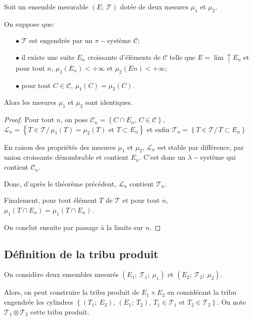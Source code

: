 \begin{theo}
Soit un ensemble mesurable $(E;~\mathcal{T})$ dotée de deux mesures $\mu_1$ et $\mu_2$.

On suppose que:
\begin{itemize}
\item[$\bullet$] $\mathcal{T}$ est engendrée par un $\pi-$système $\mathcal{C}$;
\item[$\bullet$] il existe une suite $E_n$ croissante d'éléments de $\mathcal{C}$ telle que $E = \lim \uparrow E_n$ et pour tout $n$, $\mu_1(E_n)<+\infty$ et $\mu_2(En)<+\infty$;
\item[$\bullet$] pour tout $C \in \mathcal{C}$, $\mu_1(C) = \mu_2(C)$.
\end{itemize}

Alors les mesures $\mu_1$ et $\mu_2$ sont identiques.
\end{theo}


\begin{proof}
Pour tout $n$, on pose $\mathcal{C}_n = \left \{C \cap E_n, \, C \in \mathcal{C} \right \}$, $\mathcal{L}_n = \left \{ T \in \mathcal{T} / \, \mu_1(T)=\mu_2(T) \text{ et }T \subset E_n \right \}$ et enfin $\mathcal{T}_n = \left \{ T \in \mathcal{T}/ \, T \subset E_n\right \}$

En raison des propriétés des mesures $\mu_1$ et $\mu_2$, $\mathcal{L}_n$ est stable par différence, par union croissante dénombrable et contient $E_n$. C'est donc un $\lambda-$système qui contient $\mathcal{C}_n$.

Donc, d'après le théorème précédent, $\mathcal{L}_n$ contient $\mathcal{T}_n$.

Finalement, pour tout élément $T$ de $\mathcal{T}$ et pour tout $n$, $\mu_1\left(T \cap E_n\right)=\mu_1\left(T \cap E_n\right)$. 

On conclut ensuite par passage à la limite sur $n$.
\end{proof}

\subsection{Définition de la tribu produit}

On considère deux ensembles mesurés $(E_1;~\mathcal{T}_1;~\mu_1)$ et $(E_2;~\mathcal{T}_2;~\mu_2)$.

Alors, on peut construire la tribu produit de $E_1 \times E_2$ en considérant la tribu engendrée les cylindres $\left \{ \left(T_1;~E_2\right), \, \left(E_1;~T_2\right), \, T_1 \in \mathcal{T}_1 \text{ et }T_2 \in \mathcal{T}_2\right \}$. On note $\mathcal{T}_1 \otimes \mathcal{T}_2$ cette tribu produit.

